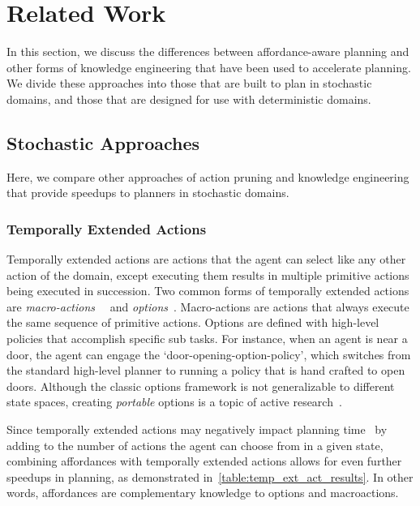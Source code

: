 \documentclass[letterpaper]{article}
\begin{document}
\section{Related Work}
\label{sec:related-work}

In this section, we discuss the differences between
affordance-aware planning and other forms of knowledge engineering that
have been used to accelerate planning. We divide these approaches
into those that are built to plan in stochastic domains, and those that are
designed for use with deterministic domains.

\subsection{Stochastic Approaches}

Here, we compare other approaches of action pruning and
knowledge engineering that provide speedups to planners
in stochastic domains.

\subsubsection{Temporally Extended Actions}
Temporally extended actions are actions that the agent can select like
any other action of the domain, except executing them results in
multiple primitive actions being executed in succession. Two common
forms of temporally extended actions are {\em
  macro-actions}~\cite{hauskrecht98} ~and {\em
  options}~\cite{sutton99}.  Macro-actions are actions that always
execute the same sequence of primitive actions. Options are defined
with high-level policies that accomplish specific sub tasks. For
instance, when an agent is near a door, the agent can engage the
`door-opening-option-policy', which switches from the standard
high-level planner to running a policy that is hand crafted to open
doors.  Although the classic options framework is not generalizable to
different state spaces, creating {\em portable} options is a topic of
active
research~\cite{konidaris07,konidaris2009efficient,Ravindran03analgebraic,croonenborghs2008learning,andre2002state,konidaris2012transfer}.

Since temporally extended actions may negatively impact planning
time~\cite{Jong:2008zr} by adding to the number of actions the agent
can choose from in a given state, combining affordances with
temporally extended actions allows for even further speedups in
planning, as demonstrated in~\ref{table:temp_ext_act_results}. In
other words, affordances are complementary knowledge to options and
macroactions.
\end{document}
